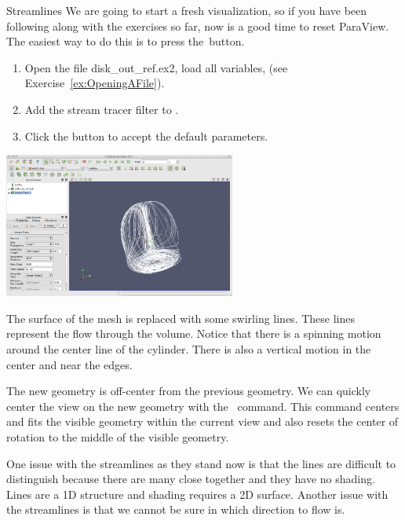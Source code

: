 \begin{exercise}{Streamlines}
  \label{ex:Streamlines}%
  We are going to start a fresh visualization, so if you have been
  following along with the exercises so far, now is a good time to reset
  ParaView.  The easiest way to do this is to press the~\disconnect button.

  \begin{enumerate}
  \item Open the file disk\_out\_ref.ex2, load all variables, \apply (see
    Exercise~\ref{ex:OpeningAFile}).
  \item Add the stream tracer filter \streamTracer to
    .
  \item Click the \apply button to accept the default parameters.
  \end{enumerate}

  \begin{inlinefig}
    \includegraphics[width=3in]{images/StreamTracer0}
  \end{inlinefig}

  The surface of the mesh is replaced with some swirling lines.  These
  lines represent the flow through the volume.  Notice that there is a
  spinning motion around the center line of the cylinder.  There is also a
  vertical motion in the center and near the edges.

  The new geometry is off-center from the previous geometry.  We can
  quickly center the view on the new geometry with the ~\resetCamera command.  This command centers and fits the
  visible geometry within the current view and also resets the center of
  rotation to the middle of the visible geometry.
\end{exercise}

One issue with the streamlines as they stand now is that the lines are
difficult to distinguish because there are many close together and they
have no shading.  Lines are a 1D structure and shading requires a 2D
surface.  Another issue with the streamlines is that we cannot be sure in which
direction to flow is.

